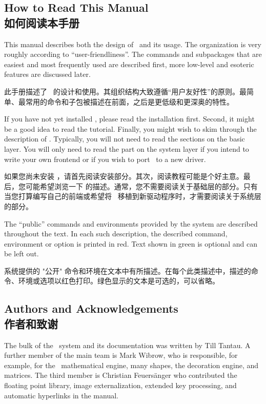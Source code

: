 
\subsection{How to Read This Manual\\如何阅读本手册}

This manual describes both the design of \tikzname\ and its usage. The
organization is very roughly according to ``user-friendliness''. The commands
and subpackages that are easiest and most frequently used are described first,
more low-level and esoteric features are discussed later.



此手册描述了 \tikzname\ 的设计和使用。其组织结构大致遵循“用户友好性”的原则。最简单、最常用的命令和子包被描述在前面，之后是更低级和更深奥的特性。


If you have not yet installed \tikzname, please read the installation first.
Second, it might be a good idea to read the tutorial. Finally, you might wish
to skim through the description of \tikzname. Typically, you will not need to
read the sections on the basic layer. You will only need to read the part on
the system layer if you intend to write your own frontend or if you wish to
port \pgfname\ to a new driver.

如果您尚未安装 \tikzname，请首先阅读安装部分。其次，阅读教程可能是个好主意。最后，您可能希望浏览一下 \tikzname 的描述。通常，您不需要阅读关于基础层的部分。只有当您打算编写自己的前端或希望将 \pgfname\ 移植到新驱动程序时，才需要阅读关于系统层的部分。

The ``public'' commands and environments provided by the system are described
throughout the text. In each such description, the described command,
environment or option is printed in red. Text shown in green is optional and
can be left out.

系统提供的 "公开" 命令和环境在文本中有所描述。在每个此类描述中，描述的命令、环境或选项以红色打印。绿色显示的文本是可选的，可以省略。




\subsection{Authors and Acknowledgements\\作者和致谢}
\label{section-authors}

The bulk of the \pgfname\ system and its documentation was written by Till
Tantau. A further member of the main team is Mark Wibrow, who is responsible,
for example, for the \pgfname\ mathematical engine, many shapes, the decoration
engine, and matrices. The third member is Christian Feuers\"anger who
contributed the floating point library, image externalization, extended key
processing, and automatic hyperlinks in the manual.

